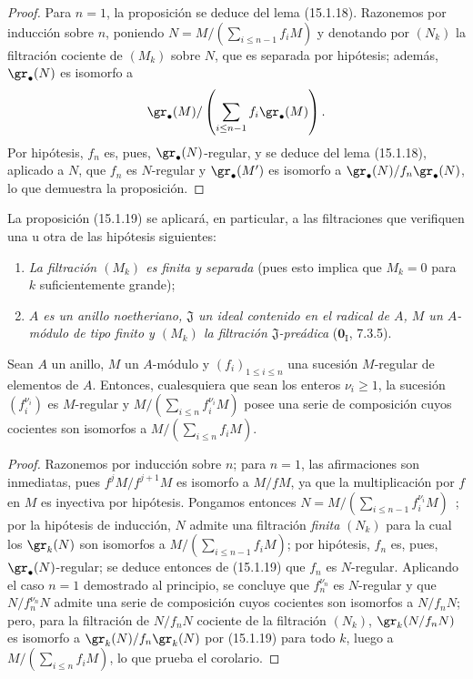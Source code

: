 \begin{proof}
Para $n=1$, la proposición se deduce del lema (15.1.18). Razonemos por
inducción sobre $n$, poniendo
$N=M/(\sum_{i\leq n-1}f_iM)$
y denotando por $(N_k)$ la filtración cociente de $(M_k)$ sobre $N$, que es
separada por hipótesis; además, $\gr_\bullet(N)$ es isomorfo a
\[
  \gr_\bullet(M)/
  \left(\sum_{i\leq n-1}f_i\gr_\bullet(M)\right).
\]
Por hipótesis, $f_n$ es, pues, $\gr_\bullet(N)$-regular, y se deduce del lema
(15.1.18), aplicado a $N$, que $f_n$ es $N$-regular y $\gr_\bullet(M')$ es
isomorfo a $\gr_\bullet(N)/f_n\gr_\bullet(N)$, lo que demuestra la
proposición.
\end{proof}

La proposición (15.1.19) se aplicará, en particular, a las filtraciones que
verifiquen una u otra de las hipótesis siguientes:
\begin{enumerate}
  \item[$1^\circ$] \emph{La filtración $(M_k)$ es finita y separada} (pues esto
  implica que $M_k=0$ para $k$ suficientemente grande);
  \item[$2^\circ$] \emph{$A$ es un anillo noetheriano, $\mathfrak{J}$ un ideal
  contenido en el radical de $A$, $M$ un $A$-módulo de tipo finito y $(M_k)$
  la filtración $\mathfrak{J}$-preádica} ($\mathbf{0}_{\mathrm I}$, 7.3.5).
\end{enumerate}


\begin{corollary}[15.1.20]
\label{0.15.1.20-fr}

Sean $A$ un anillo, $M$ un $A$-módulo y $(f_i)_{1\leq i\leq n}$ una sucesión
$M$-regular de elementos de $A$. Entonces, cualesquiera que sean los enteros
$\nu_i\geq1$, la sucesión $(f_i^{\nu_i})$ es $M$-regular y
$M/(\sum_{i\leq n}f_i^{\nu_i}M)$ posee una serie de composición cuyos
cocientes son isomorfos a $M/(\sum_{i\leq n}f_iM)$.
\end{corollary}

\begin{proof}
Razonemos por inducción sobre $n$; para $n=1$, las afirmaciones son inmediatas,
pues $f^jM/f^{j+1}M$ es isomorfo a $M/fM$, ya que la multiplicación por $f$ en
$M$ es inyectiva por hipótesis. Pongamos entonces
$N=M/(\sum_{i\leq n-1}f_i^{\nu_i}M)$~;
por la hipótesis de inducción, $N$ admite una filtración \emph{finita} $(N_k)$ para la
cual los $\gr_k(N)$ son isomorfos a
$M/(\sum_{i\leq n-1}f_iM)$; por hipótesis, $f_n$ es, pues,
$\gr_\bullet(N)$-regular; se deduce entonces de (15.1.19) que $f_n$ es
$N$-regular. Aplicando el caso $n=1$ demostrado al principio, se concluye que
$f_n^{\nu_n}$ es $N$-regular y que $N/f_n^{\nu_n}N$ admite una serie de
composición cuyos cocientes son isomorfos a $N/f_nN$; pero, para la filtración
de $N/f_nN$ cociente de la filtración $(N_k)$,
$\gr_k(N/f_nN)$ es isomorfo a $\gr_k(N)/f_n\gr_k(N)$ por (15.1.19) para todo
$k$, luego a $M/(\sum_{i\leq n}f_iM)$, lo que prueba el corolario.
\end{proof}

